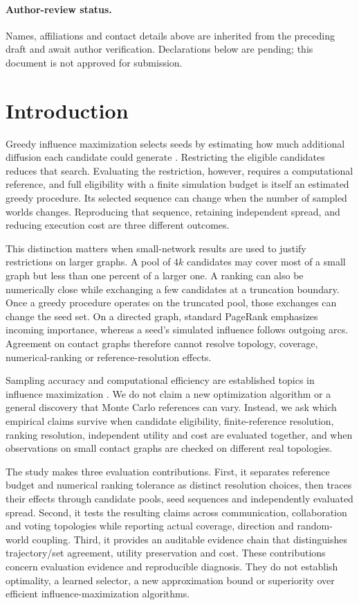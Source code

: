 \documentclass[smallextended]{svjour3}
\begin{document}
\paragraph{Author-review status.} Names, affiliations and contact details above are inherited from the preceding draft and await author verification. Declarations below are pending; this document is not approved for submission.

\section{Introduction}
Greedy influence maximization selects seeds by estimating how much additional diffusion each candidate could generate \cite{ref1}. Restricting the eligible candidates reduces that search. Evaluating the restriction, however, requires a computational reference, and full eligibility with a finite simulation budget is itself an estimated greedy procedure. Its selected sequence can change when the number of sampled worlds changes. Reproducing that sequence, retaining independent spread, and reducing execution cost are three different outcomes.

This distinction matters when small-network results are used to justify restrictions on larger graphs. A pool of $4k$ candidates may cover most of a small graph but less than one percent of a larger one. A ranking can also be numerically close while exchanging a few candidates at a truncation boundary. Once a greedy procedure operates on the truncated pool, those exchanges can change the seed set. On a directed graph, standard PageRank emphasizes incoming importance, whereas a seed's simulated influence follows outgoing arcs. Agreement on contact graphs therefore cannot resolve topology, coverage, numerical-ranking or reference-resolution effects.

Sampling accuracy and computational efficiency are established topics in influence maximization \cite{ref2,ref8,ref9,ref16}. We do not claim a new optimization algorithm or a general discovery that Monte Carlo references can vary. Instead, we ask which empirical claims survive when candidate eligibility, finite-reference resolution, ranking resolution, independent utility and cost are evaluated together, and when observations on small contact graphs are checked on different real topologies.

The study makes three evaluation contributions. First, it separates reference budget and numerical ranking tolerance as distinct resolution choices, then traces their effects through candidate pools, seed sequences and independently evaluated spread. Second, it tests the resulting claims across communication, collaboration and voting topologies while reporting actual coverage, direction and random-world coupling. Third, it provides an auditable evidence chain that distinguishes trajectory/set agreement, utility preservation and cost. These contributions concern evaluation evidence and reproducible diagnosis. They do not establish optimality, a learned selector, a new approximation bound or superiority over efficient influence-maximization algorithms.
\end{document}
